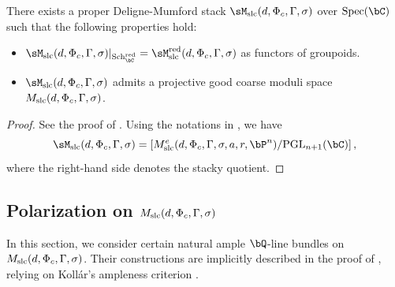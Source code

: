 \documentclass[11pt,letterpaper]{amsart}
\numberwithin{equation}{section}
\begin{document}
	\begin{thm} \label{thm_moduli_stable_var}  
		There exists a proper Deligne-Mumford stack $\sM_{\rm slc}(d, \Phi_c, \Gamma, \sigma)$ over ${\rm Spec}(\bC)$ such that the following properties hold:  
		\begin{itemize}  
			\item $\sM_{\rm slc}(d, \Phi_c, \Gamma, \sigma)|_{{\rm Sch}_{\bC}^{\rm red}} = \sM^{\rm red}_{\rm slc}(d, \Phi_c, \Gamma, \sigma)$ as functors of groupoids.  
			\item $\sM_{\rm slc}(d, \Phi_c, \Gamma, \sigma)$ admits a projective good coarse moduli space $M_{\rm slc}(d, \Phi_c, \Gamma, \sigma)$.  
		\end{itemize}  
	\end{thm}  
	\begin{proof}  
		See the proof of \cite[Theorem 1.14]{Birkar2022}. Using the notations in \cite[\S 10.7]{Birkar2022}, we have  
		$$
		\sM_{\rm slc}(d, \Phi_c, \Gamma, \sigma) = \left[M_{\rm slc}^e(d, \Phi_c, \Gamma, \sigma, a, r, \bP^n)/{\rm PGL}_{n+1}(\bC)\right],
		$$  
		where the right-hand side denotes the stacky quotient.  
	\end{proof}
	\subsection{Polarization on $M_{\rm slc}(d,\Phi_c,\Gamma,\sigma)$}\label{section_polarization_moduli}
	In this section, we consider certain natural ample $\bQ$-line bundles on $M_{\rm slc}(d, \Phi_c, \Gamma, \sigma)$. Their constructions are implicitly described in the proof of \cite[Theorem 1.14]{Birkar2022}, relying on Koll\'ar's ampleness criterion \cite{Kollar1990}.  
	
\end{document}
